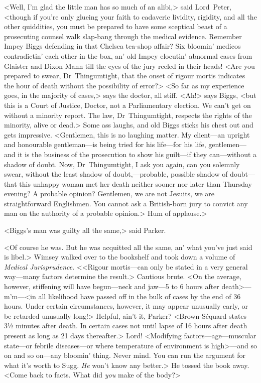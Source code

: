 <Well, I'm glad the little man has so much of an alibi,> said Lord~Peter, <though if you're only glueing your faith to cadaveric lividity, rigidity, and all the other quiddities, you must be prepared to have some sceptical beast of a prosecuting counsel walk slap-bang through the medical evidence. Remember Impey Biggs defending in that Chelsea tea-shop affair? Six bloomin' medicos contradictin' each other in the box, an' old Impey elocutin' abnormal cases from Glaister and Dixon Mann till the eyes of the jury reeled in their heads! <Are you prepared to swear, Dr~Thingumtight, that the onset of rigour mortis indicates the hour of death without the possibility of error?> <So far as my experience goes, in the majority of cases,> says the doctor, all stiff. <Ah!> says Biggs, <but this is a Court of Justice, Doctor, not a Parliamentary election. We can't get on without a minority report. The law, Dr~Thingumtight, respects the rights of the minority, alive or dead.> Some ass laughs, and old Biggs sticks his chest out and gets impressive. <Gentlemen, this is no laughing matter. My client—an upright and honourable gentleman—is being tried for his life—for his life, gentlemen—and it is the business of the prosecution to show his guilt—if they can—without a shadow of doubt. Now, Dr~Thingumtight, I ask you again, can you solemnly swear, without the least shadow of doubt,—probable, possible shadow of doubt—that this unhappy woman met her death neither sooner nor later than Thursday evening? A probable opinion? Gentlemen, we are not Jesuits, we are straightforward Englishmen. You cannot ask a British-born jury to convict any man on the authority of a probable opinion.> Hum of applause.>

<Biggs's man was guilty all the same,> said Parker.

<Of course he was. But he was acquitted all the same, an' what you've just said is libel.> Wimsey walked over to the bookshelf and took down a volume of \textit{Medical Jurisprudence}. <<Rigour mortis—can only be stated in a very general way—many factors determine the result.> Cautious brute. <On the average, however, stiffening will have begun—neck and jaw—5 to 6 hours after death>—m'm—<in all likelihood have passed off in the bulk of cases by the end of 36 hours. Under certain circumstances, however, it may appear unusually early, or be retarded unusually long!> Helpful, ain't it, Parker? <Brown-Séquard states \textellipsis 3½ minutes after death\textellipsis . In certain cases not until lapse of 16 hours after death \textellipsis present as long as 21 days thereafter.> Lord! <Modifying factors—age—muscular state—or febrile diseases—or where temperature of environment is high>—and so on and so on—any bloomin' thing. Never mind. You can run the argument for what it's worth to Sugg. \textit{He} won't know any better.> He tossed the book away. <Come back to facts. What did \textit{you} make of the body?>

